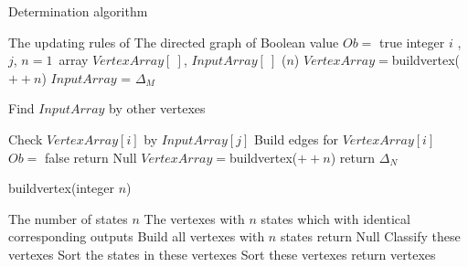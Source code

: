 \begin{algorithm}[h]
\caption{Determination algorithm}
\begin{algorithmic}[1]
\REQUIRE 
The updating rules of \BCN
\ENSURE  
The directed graph of \BCN
\STATE Boolean value $Ob=$ true 
\STATE integer $i$ , $j$, $n=1$\
\STATE array $VertexArray[\ ]$, $InputArray[\ ]$
($n$)
\STATE $VertexArray=${\sf buildvertex}($++n$)
\STATE $InputArray$ = $\Delta_M$ 
\ELSE

\STATE Find $InputArray$ by other vertexes

\ENDIF
{}
\STATE Check $VertexArray[i]$ by $InputArray[j]$ 
\STATE Build edges for $VertexArray[i]$ 
\ENDFOR
{}
\STATE  $Ob=$ false 
\STATE return Null
\ENDIF
\ENDFOR
\STATE $VertexArray=${\sf buildvertex}($++n$)
\ENDWHILE
\STATE return $\Delta_N$\
\end{algorithmic}
 \label{alg:1}
\end{algorithm}
\begin{algorithm}[h!]
\caption{{\sf buildvertex}(integer $n$)}
\begin{algorithmic}[1]
\REQUIRE 
The number of states $n$
\ENSURE  
The vertexes with $n$ states which with identical corresponding outputs 
\STATE  Build all vertexes with $n$ states 
\IF{(Failed to build)} 
\STATE  return Null
\ELSE 
\STATE  Classify these vertexes
\STATE Sort the states in these vertexes
\STATE Sort these vertexes
\STATE return vertexes
\ENDIF 
\end{algorithmic}
 \label{alg:2}
\end{algorithm}

